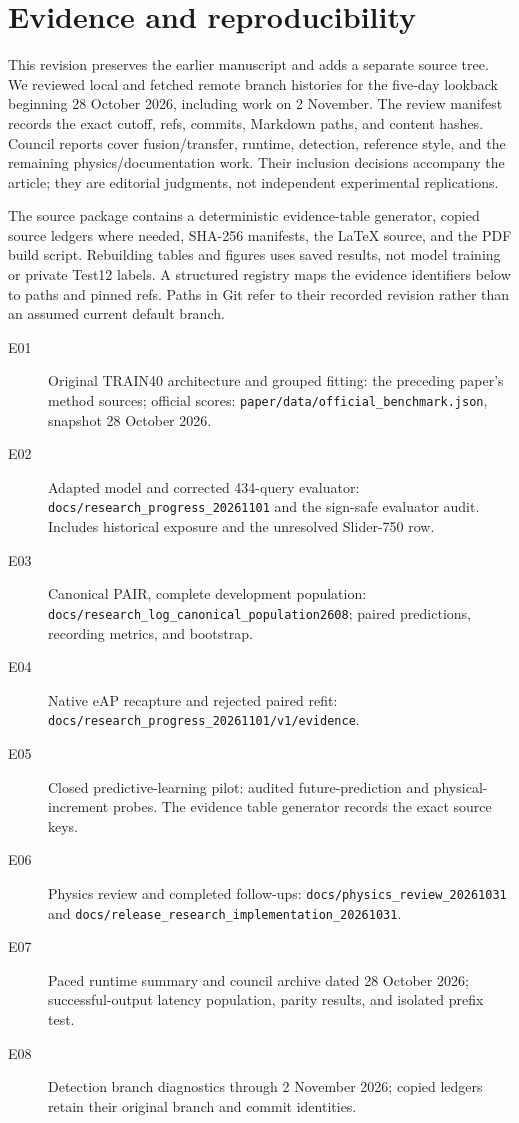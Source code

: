 \documentclass[twocolumn,letterpaper]{article}
\begin{document}
\section{Evidence and reproducibility}
\label{app:evidence}
This revision preserves the earlier manuscript and adds a separate source tree. We reviewed local and fetched remote branch histories for the five-day lookback beginning 28 October 2026, including work on 2 November. The review manifest records the exact cutoff, refs, commits, Markdown paths, and content hashes. Council reports cover fusion/transfer, runtime, detection, reference style, and the remaining physics/documentation work. Their inclusion decisions accompany the article; they are editorial judgments, not independent experimental replications.

The source package contains a deterministic evidence-table generator, copied source ledgers where needed, SHA-256 manifests, the LaTeX source, and the PDF build script. Rebuilding tables and figures uses saved results, not model training or private Test12 labels. A structured registry maps the evidence identifiers below to paths and pinned refs. Paths in Git refer to their recorded revision rather than an assumed current default branch.

\begin{description}
\item[E01] Original TRAIN40 architecture and grouped fitting: the preceding paper's method sources; official scores: \texttt{paper/data/official\_benchmark.json}, snapshot 28 October 2026.
\item[E02] Adapted model and corrected 434-query evaluator: \texttt{docs/research\_progress\_20261101} and the sign-safe evaluator audit. Includes historical exposure and the unresolved Slider-750 row.
\item[E03] Canonical PAIR, complete development population: \texttt{docs/research\_log\_canonical\_population2608}; paired predictions, recording metrics, and bootstrap.
\item[E04] Native eAP recapture and rejected paired refit: \texttt{docs/research\_progress\_20261101/v1/evidence}.
\item[E05] Closed predictive-learning pilot: audited future-prediction and physical-increment probes. The evidence table generator records the exact source keys.
\item[E06] Physics review and completed follow-ups: \texttt{docs/physics\_review\_20261031} and \texttt{docs/release\_research\_implementation\_20261031}.
\item[E07] Paced runtime summary and council archive dated 28 October 2026; successful-output latency population, parity results, and isolated prefix test.
\item[E08] Detection branch diagnostics through 2 November 2026; copied ledgers retain their original branch and commit identities.
\end{description}
\end{document}
